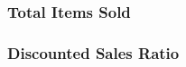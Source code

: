 \documentclass{article}
\begin{document}
            \subsubsection{Total Items Sold}
                


            \subsubsection{Discounted Sales Ratio}

\end{document}
